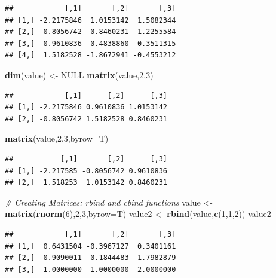 \documentclass[
]{book}
\newenvironment{Shaded}{\begin{snugshade}}{\end{snugshade}}
\newcommand{\CommentTok}[1]{\textcolor[rgb]{0.56,0.35,0.01}{\textit{#1}}}
\newcommand{\DataTypeTok}[1]{\textcolor[rgb]{0.13,0.29,0.53}{#1}}
\newcommand{\DecValTok}[1]{\textcolor[rgb]{0.00,0.00,0.81}{#1}}
\newcommand{\KeywordTok}[1]{\textcolor[rgb]{0.13,0.29,0.53}{\textbf{#1}}}
\newcommand{\NormalTok}[1]{#1}
\newcommand{\OtherTok}[1]{\textcolor[rgb]{0.56,0.35,0.01}{#1}}
\newcommand{\StringTok}[1]{\textcolor[rgb]{0.31,0.60,0.02}{#1}}
\begin{document}
\begin{verbatim}
##            [,1]       [,2]       [,3]
## [1,] -2.2175846  1.0153142  1.5082344
## [2,] -0.8056742  0.8460231 -1.2255584
## [3,]  0.9610836 -0.4838860  0.3511315
## [4,]  1.5182528 -1.8672941 -0.4553212
\end{verbatim}

\begin{Shaded}
\begin{Highlighting}[]
\KeywordTok{dim}\NormalTok{(value) <-}\StringTok{ }\OtherTok{NULL}
\KeywordTok{matrix}\NormalTok{(value,}\DecValTok{2}\NormalTok{,}\DecValTok{3}\NormalTok{)}
\end{Highlighting}
\end{Shaded}

\begin{verbatim}
##            [,1]      [,2]      [,3]
## [1,] -2.2175846 0.9610836 1.0153142
## [2,] -0.8056742 1.5182528 0.8460231
\end{verbatim}

\begin{Shaded}
\begin{Highlighting}[]
\KeywordTok{matrix}\NormalTok{(value,}\DecValTok{2}\NormalTok{,}\DecValTok{3}\NormalTok{,}\DataTypeTok{byrow=}\NormalTok{T)}
\end{Highlighting}
\end{Shaded}

\begin{verbatim}
##           [,1]       [,2]      [,3]
## [1,] -2.217585 -0.8056742 0.9610836
## [2,]  1.518253  1.0153142 0.8460231
\end{verbatim}

\begin{Shaded}
\begin{Highlighting}[]
\CommentTok{# Creating Matrices: rbind and cbind functions}
\NormalTok{value <-}\StringTok{ }\KeywordTok{matrix}\NormalTok{(}\KeywordTok{rnorm}\NormalTok{(}\DecValTok{6}\NormalTok{),}\DecValTok{2}\NormalTok{,}\DecValTok{3}\NormalTok{,}\DataTypeTok{byrow=}\NormalTok{T)}
\NormalTok{value2 <-}\StringTok{ }\KeywordTok{rbind}\NormalTok{(value,}\KeywordTok{c}\NormalTok{(}\DecValTok{1}\NormalTok{,}\DecValTok{1}\NormalTok{,}\DecValTok{2}\NormalTok{))}
\NormalTok{value2}
\end{Highlighting}
\end{Shaded}

\begin{verbatim}
##            [,1]       [,2]       [,3]
## [1,]  0.6431504 -0.3967127  0.3401161
## [2,] -0.9090011 -0.1844483 -1.7982879
## [3,]  1.0000000  1.0000000  2.0000000
\end{verbatim}
\end{document}
